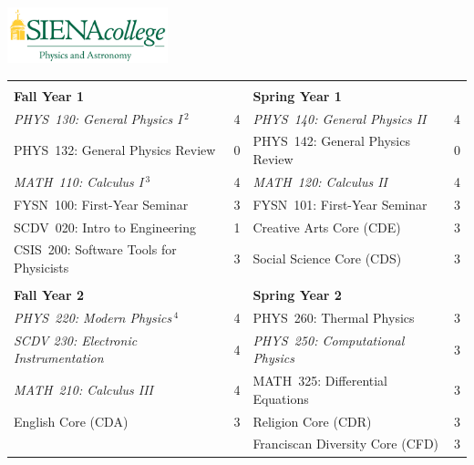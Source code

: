 \documentclass[12pt]{article}
\begin{document}
\hfill \includegraphics[width=0.35\textwidth]{siena_phys_astro_print_crop.jpg}

\vspace{0.1cm}
\vspace{0.1cm}

\vspace*{-5mm}
\begin{table}[h!]
\begin{center}
{\renewcommand{\arraystretch}{1.2}
\begin{tabular*}{0.9\textwidth}{@{\extracolsep{\fill}}lclc}
 & \\
{\Large \textbf{Fall Year 1}} & & {\Large \textbf{Spring Year 1}} & \\
\hline
{\em PHYS~130: General Physics I}\,$^{2}$  & 4 & {\em PHYS~140: General Physics II}     & 4 \\
PHYS~132: General Physics Review           & 0 & PHYS~142: General Physics Review & 0\\
{\em MATH~110: Calculus I}\,$^{3}$         & 4 & {\em MATH~120: Calculus II}            & 4 \\
FYSN~100: First-Year Seminar               & 3 & FYSN~101: First-Year Seminar     & 3\\
SCDV~020: Intro to Engineering             & 1 & Creative Arts Core (CDE)         & 3 \\
CSIS~200: Software Tools for Physicists    & 3 & Social Science Core (CDS) & 3 \\

 & \\
{\Large \textbf{Fall Year 2}} & & {\Large \textbf{Spring Year 2}} & \\
\hline
{\em PHYS~220: Modern Physics}\,$^{4}$      & 4 & PHYS~260: Thermal Physics        & 3 \\
{\em SCDV 230: Electronic Instrumentation} & 4 & {\em PHYS~250: Computational Physics} & 3  \\
{\em MATH~210: Calculus III}               & 4 & MATH~325: Differential Equations & 3 \\
English Core (CDA)                         & 3 & Religion Core (CDR)            & 3 \\
                                           &   & Franciscan Diversity Core (CFD)  & 3 \\


\end{tabular*}}
\end{center}
\end{table}
\end{document}
